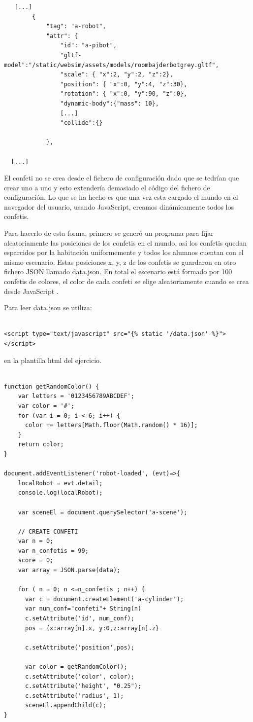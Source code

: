 \begin{lstlisting}
   [...]
        {
            "tag": "a-robot",
            "attr": {
                "id": "a-pibot",
                "gltf-model":"/static/websim/assets/models/roombajderbotgrey.gltf",
                "scale": { "x":2, "y":2, "z":2},
                "position": { "x":0, "y":4, "z":30},
                "rotation": { "x":0, "y":90, "z":0},
                "dynamic-body":{"mass": 10},
                [...]
                "collide":{}

            },
           
  [...]
\end{lstlisting}

El confeti no se crea desde el fichero de configuración dado que se tedrían que crear uno a uno y esto extendería demasiado el código del fichero de configuración. Lo que se ha hecho es que una vez esta cargado el mundo en el navegador del usuario, usando JavaScript, creamos dinámicamente todos los confetis.

Para hacerlo de esta forma, primero se generó un programa para fijar aleatoriamente las posiciones de los confetis en el mundo, así los confetis quedan esparcidos por la habitación uniformemente y todos los alumnos cuentan con el mismo escenario. Estas posiciones x, y, z de los confetis se guardaron en otro fichero JSON llamado data.json. En total el escenario está formado por 100 confetis de colores, el color de cada confeti se elige aleatoriamente cuando se crea  desde JavaScript .

Para leer data.json se utiliza:
\begin{lstlisting}

<script type="text/javascript" src="{% static '/data.json' %}"></script>
\end{lstlisting}
en la plantilla html del ejercicio.

\begin{lstlisting}

function getRandomColor() {
    var letters = '0123456789ABCDEF';
    var color = '#';
    for (var i = 0; i < 6; i++) {
      color += letters[Math.floor(Math.random() * 16)];
    }
    return color;
}

document.addEventListener('robot-loaded', (evt)=>{
    localRobot = evt.detail;
    console.log(localRobot);

    var sceneEl = document.querySelector('a-scene');

    // CREATE CONFETI
    var n = 0;
    var n_confetis = 99;
    score = 0;
    var array = JSON.parse(data);

    for ( n = 0; n <=n_confetis ; n++) {
      var c = document.createElement('a-cylinder');
      var num_conf="confeti"+ String(n)
      c.setAttribute('id', num_conf);
      pos = {x:array[n].x, y:0,z:array[n].z}
    
      c.setAttribute('position',pos);
    
      var color = getRandomColor();
      c.setAttribute('color', color);
      c.setAttribute('height', "0.25");
      c.setAttribute('radius', 1);
      sceneEl.appendChild(c);
}
\end{lstlisting}

